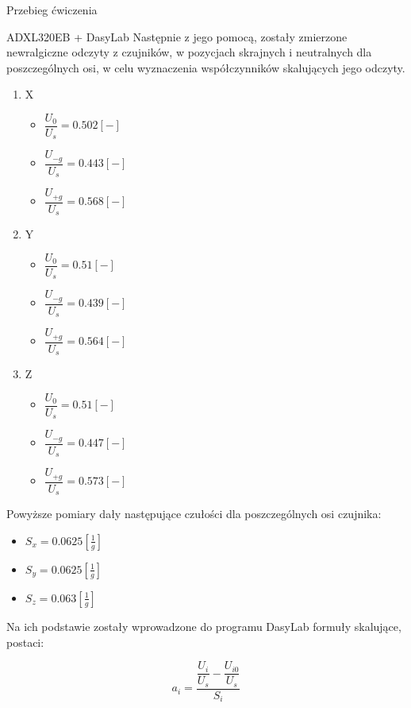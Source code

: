 \documentclass[12pt]{article}
\begin{document}
\begin{section}{Przebieg ćwiczenia}
\begin{subsection}{ADXL320EB + DasyLab}
        Następnie z jego pomocą, zostały zmierzone newralgiczne odczyty z
        czujników, w pozycjach skrajnych i neutralnych dla poszczególnych osi, w
        celu wyznaczenia współczynników skalujących jego odczyty.
        \begin{enumerate}
          \item X
          \begin{itemize}
            \item $\dfrac{U_{0}}{U_{s}}= 0.502[-]$
            \item $\dfrac{U_{-g}}{U_{s}}= 0.443[-]$
            \item $\dfrac{U_{+g}}{U_{s}}= 0.568[-]$
          \end{itemize}
          \item Y
          \begin{itemize}
            \item $\dfrac{U_{0}}{U_{s}}= 0.51[-]$
            \item $\dfrac{U_{-g}}{U_{s}}= 0.439[-]$
            \item $\dfrac{U_{+g}}{U_{s}}= 0.564[-]$
          \end{itemize}
          \newpage
          \item Z
          \begin{itemize}
            \item $\dfrac{U_{0}}{U_{s}}= 0.51[-]$
            \item $\dfrac{U_{-g}}{U_{s}}= 0.447[-]$
            \item $\dfrac{U_{+g}}{U_{s}}= 0.573[-]$
          \end{itemize}
        \end{enumerate}
        
        Powyższe pomiary dały następujące czułości dla poszczególnych osi
        czujnika:
        \begin{itemize}
          \item $S_x=0.0625[\frac{1}{g}]$
          \item $S_y=0.0625[\frac{1}{g}]$
          \item $S_z=0.063[\frac{1}{g}]$
        \end{itemize}
        
        Na ich podstawie zostały wprowadzone do programu DasyLab formuły
        skalujące, postaci:
        
        \begin{equation}
            a_i=\frac{\dfrac{U_{i}}{U_s} - \dfrac{U_{i0}}{U_s}}{S_i}
        \end{equation}
        

\end{subsection}
\end{section}
\end{document}
